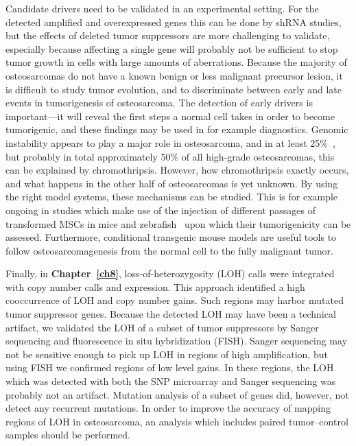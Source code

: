 Candidate drivers need to be validated in an experimental setting. For the detected amplified and overexpressed genes this can be done by shRNA studies, but the effects of deleted tumor suppressors are more challenging to validate, especially because affecting a single gene will probably not be sufficient to stop tumor growth in cells with large amounts of aberrations. Because the majority of osteosarcomas do not have a known benign or less malignant precursor lesion, it is difficult to study tumor evolution, and to discriminate between early and late events in tumorigenesis of osteosarcoma. The detection of early drivers is important---it will reveal the first steps a normal cell takes in order to become tumorigenic, and these findings may be used in for example diagnostics. Genomic instability appears to play a major role in osteosarcoma, and in at least 25\%~\cite{stephens2011massive}, but probably in total approximately 50\% of all high\hyp{}grade osteosarcomas, this can be explained by chromothripsis. However, how chromothripsis exactly occurs, and what happens in the other half of osteosarcomas is yet unknown. By using the right model systems, these mechanisms can be studied. This is for example ongoing in studies which make use of the injection of different passages of transformed MSCs in mice and zebrafish~\cite{mohseny2012osteosarcomamodels,mohseny2012osteosarcomazebrafish} upon which their tumorigenicity can be assessed. Furthermore, conditional transgenic mouse models are useful tools to follow osteosarcomagenesis from the normal cell to the fully malignant tumor.

Finally, in {\bf Chapter~\ref{ch8}}, loss\hyp{}of\hyp{}heterozygosity (LOH) calls were integrated with copy number calls and expression. This approach identified a high cooccurrence of LOH and copy number gains. Such regions may harbor mutated tumor suppressor genes. Because the detected LOH may have been a technical artifact, we validated the LOH of a subset of tumor suppressors by Sanger sequencing and fluorescence in situ hybridization (FISH). Sanger sequencing may not be sensitive enough to pick up LOH in regions of high amplification, but using FISH we confirmed regions of low level gains. In these regions, the LOH which was detected with both the SNP microarray and Sanger sequencing was probably not an artifact. Mutation analysis of a subset of genes did, however, not detect any recurrent mutations. In order to improve the accuracy of mapping regions of LOH in osteosarcoma, an analysis which includes paired tumor--control samples should be performed.

